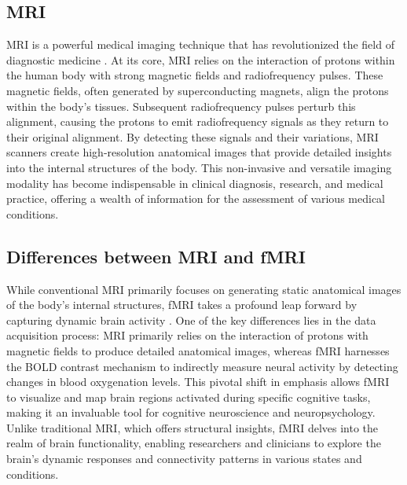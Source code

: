 \subsection{MRI}

MRI is a powerful medical imaging technique that has revolutionized the field of diagnostic medicine \cite{westbrook2018mri}. At its core, MRI relies on the interaction of protons within the human body with strong magnetic fields and radiofrequency pulses. These magnetic fields, often generated by superconducting magnets, align the protons within the body's tissues. Subsequent radiofrequency pulses perturb this alignment, causing the protons to emit radiofrequency signals as they return to their original alignment. By detecting these signals and their variations, MRI scanners create high-resolution anatomical images that provide detailed insights into the internal structures of the body. This non-invasive and versatile imaging modality has become indispensable in clinical diagnosis, research, and medical practice, offering a wealth of information for the assessment of various medical conditions.

\subsection{Differences between MRI and fMRI}

While conventional MRI primarily focuses on generating static anatomical images of the body's internal structures, fMRI takes a profound leap forward by capturing dynamic brain activity \cite{logothetis2008we}. One of the key differences lies in the data acquisition process: MRI primarily relies on the interaction of protons with magnetic fields to produce detailed anatomical images, whereas fMRI harnesses the BOLD contrast mechanism to indirectly measure neural activity by detecting changes in blood oxygenation levels. This pivotal shift in emphasis allows fMRI to visualize and map brain regions activated during specific cognitive tasks, making it an invaluable tool for cognitive neuroscience and neuropsychology. Unlike traditional MRI, which offers structural insights, fMRI delves into the realm of brain functionality, enabling researchers and clinicians to explore the brain's dynamic responses and connectivity patterns in various states and conditions.

